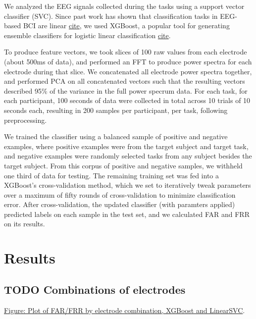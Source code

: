\documentclass[letterpaper,twocolumn,10pt]{article}
\begin{document}
We analyzed the EEG signals collected during the tasks using a support vector classifier (SVC). Since past work has shown that classification tasks in EEG-based BCI are linear \underline{cite}, we used XGBoost, a popular tool for generating ensemble classifiers for logistic linear classification \underline{cite}.

To produce feature vectors, we took slices of 100 raw values from each electrode (about 500ms of data), and performed an FFT to produce power spectra for each electrode during that slice. We concatenated all electrode power spectra together, and performed PCA on all concatenated vectors such that the resulting vectors described 95\% of the variance in the full power specrum data. For each task, for each participant, 100 seconds of data were collected in total across 10 trials of 10 seconds each, resulting in 200 samples per participant, per task, following preprocessing.

We trained the classifier using a balanced sample of positive and negative examples, where positive examples were from the target subject and target task, and negative examples were randomly selected tasks from any subject besides the target subject.
From this corpus of positive and negative samples, we withheld one third of data for testing. 
The remaining training set was fed into a XGBoost's cross-validation method, which we set to iteratively tweak parameters over a maximum of fifty rounds of cross-validation to minimize classification error.
After cross-validation, the updated classifier (with paramters applied) predicted labels on each sample in the test set, and we calculated FAR and FRR on its results.

\section{Results}
\label{sec:org6705b1d}
\subsection{{\bfseries\sffamily TODO} Combinations of electrodes}
\label{sec:org21b14ae}

\underline{Figure: Plot of FAR/FRR by electrode combination, XGBoost and LinearSVC}.
\end{document}
